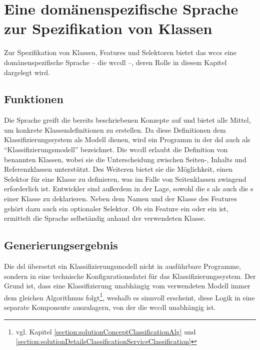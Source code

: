 \section{Eine domänenspezifische Sprache zur Spezifikation von Klassen}
    Zur Spezifikation von Klassen, Features und Selektoren bietet das
    \gls{wccs} eine domänenspezifische Sprache
    -- die \gls{wccdl} --,
    deren Rolle in diesem Kapitel dargelegt wird.

    \subsection{Funktionen}
        Die Sprache greift die bereits beschriebenen
        Konzepte
        auf und bietet alle Mittel, um konkrete Klassendefinitionen zu erstellen.
        Da diese Definitionen dem Klassifizierungssystem als Modell dienen,
        wird ein Programm in der \gls{dsl} auch als "`Klassifizierungsmodell"' bezeichnet.
        Die \gls{wccdl} erlaubt die Definition von benannten Klassen,
        wobei sie die Unterscheidung zwischen Seiten-, Inhalts und Referenzklassen unterstützt.
        Des Weiteren bietet sie die Möglichkeit, einen Selektor für eine Klasse zu definieren,
        was im Falle von Seitenklassen zwingend erforderlich ist.
        Entwickler sind außerdem in der Lage, sowohl die {\scalarFeature}s
        als auch die {\collectionFeature}s einer Klasse zu deklarieren.
        Neben dem Namen und der Klasse des Features gehört dazu auch ein optionaler Selektor.
        Ob ein Feature ein {\contentFeature} oder ein {} ist,
        ermittelt die Sprache selbständig anhand der verwendeten Klasse.

    \subsection{Generierungsergebnis}
        \label{section:conceptDslGeneration}
        Die \gls{dsl} übersetzt ein Klassifizierungsmodell nicht in ausführbare Programme,
        sondern in eine technische Konfigurationsdatei für das Klassifizierungssystem.
        Der Grund ist, dass eine Klassifizierung unabhängig vom verwendeten Modell immer
        dem gleichen Algorithmus
        folgt\footnote{vgl. Kapitel \ref{section:solutionConceptClassificationAlg}
        und \ref{section:solutionDetailsClassificationServiceClassification}},
        weshalb es sinnvoll erscheint, diese Logik in eine separate Komponente auszulagern,
        von der die \gls{wccdl} unabhängig ist.

